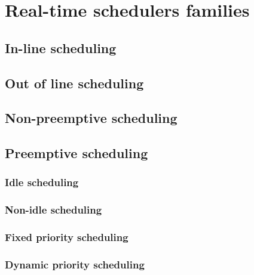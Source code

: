 
\chapter{Real-time schedulers families}
\doMinitoc

\section{In-line scheduling}

\section{Out of line scheduling}

\section{Non-preemptive scheduling}

\section{Preemptive scheduling}

\subsection{Idle scheduling}

\subsection{Non-idle scheduling}

\subsection{Fixed priority scheduling}

\subsection{Dynamic priority scheduling}

